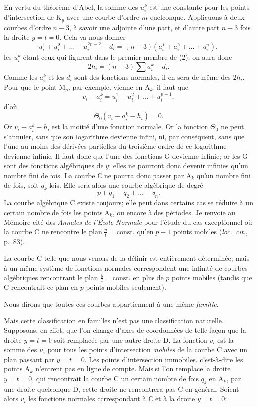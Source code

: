 \documentclass{article}
\begin{document}
En vertu du théorème d'Abel, la somme des $u_{i}^{k}$ est une constante pour les points d'intersection de $\mathrm{K}_{y}$ avec une courbe d'ordre $m$ quelconque. Appliquons à deux courbes d'ordre $n - 3$, à savoir une adjointe d'une part, et d'autre part $n - 3$ fois la droite $y = t = 0$. Cela va nous donner
\[
u_{i}^{1} + u_{i}^{2} + \ldots + u_{i}^{2p-2} + d_{i} = (n - 3)(a_{i}^{1} + a_{i}^{2} + \ldots + a_{i}^{n}),
\]
les $u_{i}^{k}$ étant ceux qui figurent dans le premier membre de (2); on aura donc
\[
2h_{i} = (n - 3)\sum a_{i}^{k} - d_{i}.
\]
Comme les $a_{i}^{k}$ et les $d_{i}$ sont des fonctions normales, il en sera de même des $2h_{i}$.
Pour que le point $\mathrm{M}_{p}$, par exemple, vienne en $\mathrm{A}_{k}$, il faut que
\[
v_{i} - a_{i}^{k} = u_{i}^{1} + u_{i}^{2} + \ldots + u_{i}^{p-1},
\]
d'où
\[
\Theta_{0}(v_{i} - a_{i}^{k} - h_{i}) = 0.
\]
Or $v_{i} - a_{i}^{k} - h_{i}$ est la moitié d'une fonction normale. Or la fonction $\Theta_{0}$ ne peut s'annuler, sans que son logarithme devienne infini, ni, par conséquent, sans que l'une au moins des dérivées partielles du troisième ordre de ce logarithme devienne infinie. Il faut donc que l'une des fonctions $\mathrm{G}$ devienne infinie; or les $\mathrm{G}$ sont des fonctions algébriques de $y$; elles ne pourront donc devenir infinies qu'un nombre fini de fois. La courbe $\mathrm{C}$ ne pourra donc passer par $\mathrm{A}_{k}$ qu'un nombre fini de fois, soit $q_{k}$ fois. Elle sera alors une courbe algébrique de degré
\[
p + q_{1} + q_{2} + \ldots + q_{n}.
\]
La courbe algébrique $\mathrm{C}$ existe toujours; elle peut dans certains cas se réduire à un certain nombre de fois les points $\mathrm{A}_{k}$, ou encore à des périodes. Je renvoie au Mémoire cité des \emph{Annales de l'École Normale} pour l'étude du cas exceptionnel où la courbe $\mathrm{C}$ ne rencontre le plan $\frac{y}{t} = \mathrm{const.}$ qu'en $p - 1$ points mobiles (\emph{loc.~cit.}, p.~83).

La courbe $\mathrm{C}$ telle que nous venons de la définir est entièrement déterminée; mais à un même système de fonctions normales correspondent une infinité de courbes algébriques rencontrant le plan $\frac{y}{t} = \mathrm{const.}$ en plus de $p$ points mobiles (tandis que $\mathrm{C}$ rencontrait ce plan en $p$ points mobiles seulement).

Nous dirons que toutes ces courbes appartiennent à une même \emph{famille}.

Mais cette classification en familles n'est pas une classification naturelle. Supposons, en effet, que l'on change d'axes de coordonnées de telle façon que la droite $y = t = 0$ soit remplacée par une autre droite $\mathrm{D}$. La fonction $v_{i}$ est la somme des $u_{i}$ pour tous les points d'intersection \emph{mobiles} de la courbe $\mathrm{C}$ avec un plan passant par $y = t = 0$. Les points d'intersection immobiles, c'est-à-dire les points $\mathrm{A}_{k}$ n'entrent pas en ligne de compte. Mais si l'on remplace la droite $y = t = 0$, qui rencontrait la courbe $\mathrm{C}$ un certain nombre de fois $q_{k}$ en $\mathrm{A}_{k}$, par une droite quelconque $\mathrm{D}$, cette droite ne rencontrera pas $\mathrm{C}$ en général. Soient alors $v_{i}$ les fonctions normales correspondant à $\mathrm{C}$ et à la droite $y = t = 0$;
\end{document}
